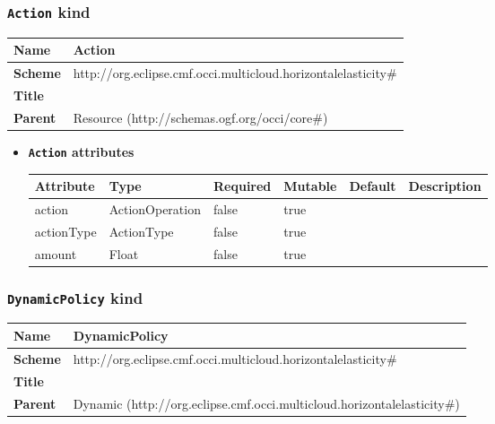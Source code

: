 \subsubsection{\texttt{Action} kind}
\begin{center}
\begin{tabular}{|l|l|}
  \hline
  \textbf{Name} & Action \\
  \hline  
  \textbf{Scheme} & http://org.eclipse.cmf.occi.multicloud.horizontalelasticity\# \\
  \hline
  \textbf{Title} &  \\
  \hline
  \textbf{Parent} & Resource (http://schemas.ogf.org/occi/core\#) \\
  \hline
\end{tabular}
\end{center}
\begin{itemize}
\item \textbf{\texttt{Action} attributes}

\begin{tabularx}{\textwidth}{|l|l|p{1.4cm}|p{1.3cm}|l|X|}
  \hline
  \textbf{Attribute} & \textbf{Type} & \textbf{Required} & \textbf{Mutable} & \textbf{Default} & \textbf{Description} \\
  \hline  
  action & ActionOperation & false & true &  &  \\
  \hline
  actionType & ActionType & false & true &  &  \\
  \hline
  amount & Float & false & true &  &  \\
  \hline
\end{tabularx}
\end{itemize}



\subsubsection{\texttt{DynamicPolicy} kind}
\begin{center}
\begin{tabular}{|l|l|}
  \hline
  \textbf{Name} & DynamicPolicy \\
  \hline  
  \textbf{Scheme} & http://org.eclipse.cmf.occi.multicloud.horizontalelasticity\# \\
  \hline
  \textbf{Title} &  \\
  \hline
  \textbf{Parent} & Dynamic (http://org.eclipse.cmf.occi.multicloud.horizontalelasticity\#) \\
  \hline
\end{tabular}
\end{center}



